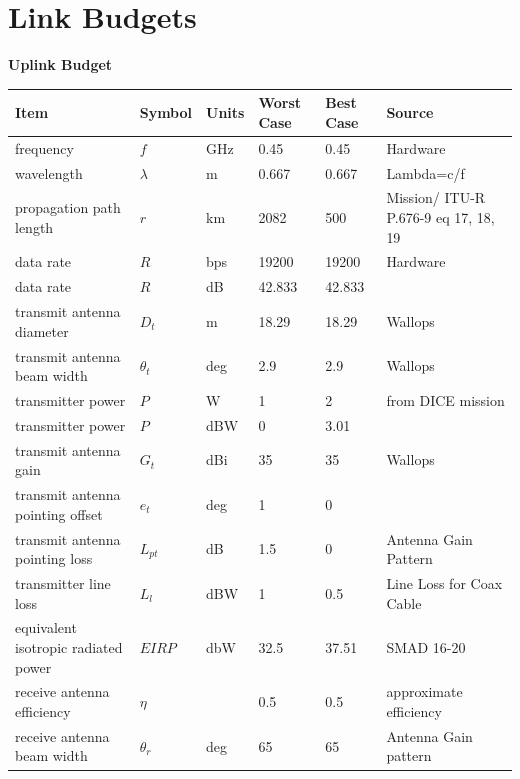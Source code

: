 \documentclass[12pt]{article}
\begin{document}
\section{Link Budgets} \label{app:link_budgets}
\textbf{Uplink Budget}
\small
\begin{center}
\begin{longtable}{| p{3.9cm} | p{1.6cm} | p{1.4cm} | p{1.4cm} | p{1.4cm} | p{5cm} |}
\hline
    \textbf{Item}  & \textbf{Symbol} & \textbf{Units}  & \textbf{Worst Case} & \textbf{Best Case} & \textbf{Source}  \\
    \hline \hline
    frequency & $f$     & GHz   & 0.45  & 0.45  & Hardware \\ \hline
    wavelength & $\lambda$ & m     & 0.667 & 0.667 & Lambda=c/f \\ \hline
    propagation path length & $r$     & km    & 2082  & 500   & Mission/ ITU-R P.676-9 eq 17, 18, 19 \\\hline
    data rate & $R$     & bps   & 19200 & 19200 & Hardware \\\hline
    data rate & $R$     & dB    & 42.833 & 42.833 &  \\\hline
    transmit antenna diameter & $D_t$  & m     & 18.29 & 18.29 & Wallops \\\hline
    transmit antenna beam width & $\theta_t$ & deg   & 2.9   & 2.9   & Wallops \\\hline
    transmitter power & $P$     & W     & 1     & 2     & from DICE mission \\\hline
    transmitter power & $P$     & dBW   & 0     & 3.01  &  \\\hline
    transmit antenna gain & $G_t$  & dBi   & 35    & 35    & Wallops \\\hline
    transmit antenna pointing offset & $e_t$  & deg   & 1     & 0     &  \\\hline
    transmit antenna pointing loss & $L_{pt}$ & dB    & 1.5   & 0     & Antenna Gain Pattern \\\hline
    transmitter line loss & $L_l$  & dBW   & 1     & 0.5   & Line Loss for Coax Cable \cite{loss-calc} \\\hline
    equivalent isotropic radiated power & $EIRP$  & dbW   & 32.5  & 37.51 & SMAD 16-20 \\\hline
    receive antenna efficiency & $\eta$   &       & 0.5   & 0.5   & approximate efficiency \\\hline
    receive antenna beam width & $\theta_r$ & deg   & 65    & 65    & Antenna Gain pattern \\\hline

\end{longtable}
\end{center}
\end{document}
